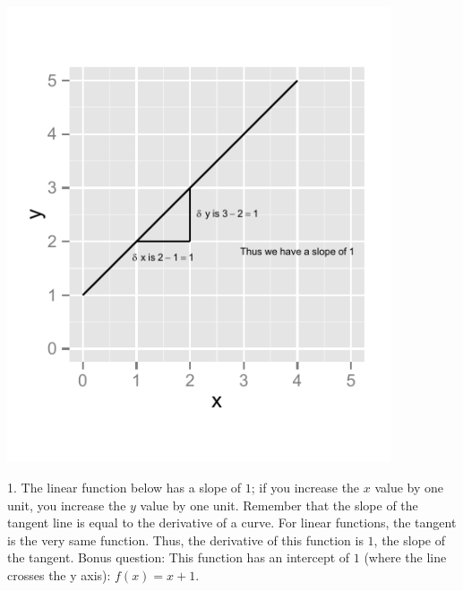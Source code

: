 \documentclass[a4paper]{report}
\begin{document}
\begin{Answer}[ref=ex0]
\newcommand{\rat}{0.55}
\newcommand{\rati}{0.45}

\begin{minipage}{\rat\textwidth}
\includegraphics[width=0.85\textwidth]{1aa.pdf}
\end{minipage}
\begin{minipage}{\rati\textwidth}
1. The linear function below has a slope of $1$; if you increase the $x$ value by one unit, you increase the $y$ value by one unit. Remember that the slope of the tangent line is equal to the derivative of a curve. For linear functions, the tangent is the very same function. Thus, the derivative of this function is $1$, the slope of the tangent. Bonus question: This function has an intercept of $1$ (where the line crosses the y axis): $f(x)=x+1$.
\end{minipage}


\end{Answer}
\end{document}
